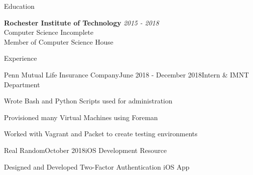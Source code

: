 \documentclass{resume} %
\begin{document}

\begin{rSection}{Education}

{\bf Rochester Institute of Technology} \hfill {\em 2015 - 2018} 
\\ Computer Science \hfill {Incomplete} \\
Member of Computer Science House \\

\end{rSection}

\begin{rSection}{Experience}

\begin{rSubsection}{Penn Mutual Life Insurance Company}{June 2018 - December 2018}{Intern \& IMNT Department}{}
\item Wrote Bash and Python Scripts used for administration
\item Provisioned many Virtual Machines using Foreman 
\item Worked with Vagrant and Packet to create testing environments
\end{rSubsection}



\begin{rSubsection}{Real Random}{October 2018}{iOS Development Resource}{}
\item Designed and Developed Two-Factor Authentication iOS App
\end{rSubsection}

\end{rSection}


\end{document}
